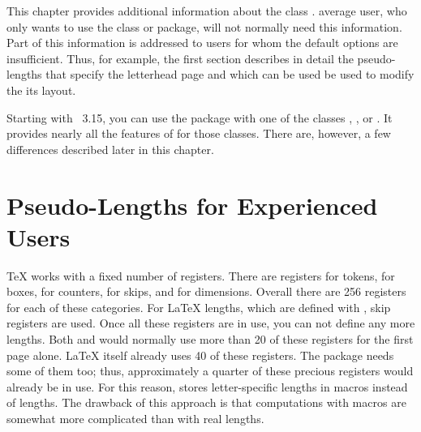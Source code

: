 \BeginIndexGroup
{}
This chapter provides additional information about the \KOMAScript{} class
.  average user, who only wants to use the class
or package, will not normally need this information. Part of this information
is addressed to users for whom the default options are insufficient. Thus,
for example, the first section describes in detail the pseudo-lengths that
specify the letterhead page and which can be used be used to modify the its
layout.%
\iffalse%
  In addition, this chapter also describes features that exist only to
  provide compatibility with the deprecated \Class{scrlettr} class. It also
  explains in detail how to convert a document from this obsolete class
  to the current  class.
\fi

%
Starting with \KOMAScript~3.15,
you can use the  package with one of the \KOMAScript{}
classes , , or . It provides
nearly all the features of  for those classes. There are,
however, a few differences described later in this chapter.%


\section{Pseudo-Lengths for Experienced Users}
\BeginIndexGroup
{}

\TeX{} works with a fixed number of registers. There are registers for tokens,
for boxes, for counters, for skips, and for dimensions. Overall there are 256
registers for each of these categories. For \LaTeX{} lengths, which are
defined with , skip registers are used. Once all these
registers are in use, you can not define any more lengths. Both
 and  would normally use more than 20 of
these registers for the first page alone. \LaTeX{} itself already uses 40 of
these registers. The \hyperref[cha:typearea]{}%
 package needs some of them too; thus, approximately a
quarter of these precious registers would already be in use. For this reason,
\KOMAScript{} stores letter-specific lengths in macros instead of lengths. The
drawback of this approach is that computations with macros are somewhat more
complicated than with real lengths.

